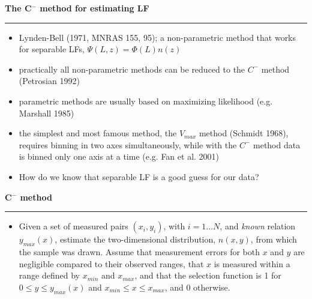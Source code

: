 \documentclass[letterpaper,landscape]{slides}
\begin{document}
\begin{slide}
\begin{center}
\bfseries
{\large {\color{red} The C$^-$ method for estimating LF}}
\end{center}
\vskip 0.2in
\hrule

\begin{itemize}
\item Lynden-Bell (1971, MNRAS 155, 95); a non-parametric method that works 
for separable LFs, $\Psi(L,z) = \Phi(L) n(z)$
\item practically all non-parametric methods can be reduced to the $C^-$
      method (Petrosian 1992)
\item parametric methods are usually based on maximizing likelihood
      (e.g. Marshall 1985)
\item the simplest and most famous method, the $V_{max}$ method (Schmidt 1968),
      requires binning in two axes simultaneously, while with the $C^-$
      method data is binned only one axis at a time (e.g. Fan et al. 2001) 
\item How do we know that separable LF is a good guess for our data?
\end{itemize}

\vfill
\end{slide}
 




\begin{slide}
\begin{center}
\bfseries
{\large {\color{red} C$^-$ method}}
\end{center}
\vskip 0.2in
\hrule

\begin{itemize}
\item
Given a set of measured pairs $(x_i, y_i)$, with 
$i=1 \dots N$, and {\it known} relation $y_{max}(x)$, estimate the two-dimensional
distribution, $n(x,y)$, from which the sample was drawn. Assume that 
measurement errors for both $x$ and $y$ are negligible compared to their observed 
ranges, that $x$ is measured within a range defined by $x_{min}$ and $x_{max}$, 
and that the selection function is 1 for $0 \le y\le y_{max}(x)$ and $x_{min} \le x \le x_{max}$,  
and 0 otherwise.
\end{itemize}

\vskip -0.7in
\phantom{x}

\vfill
\end{slide}
 
\end{document}
